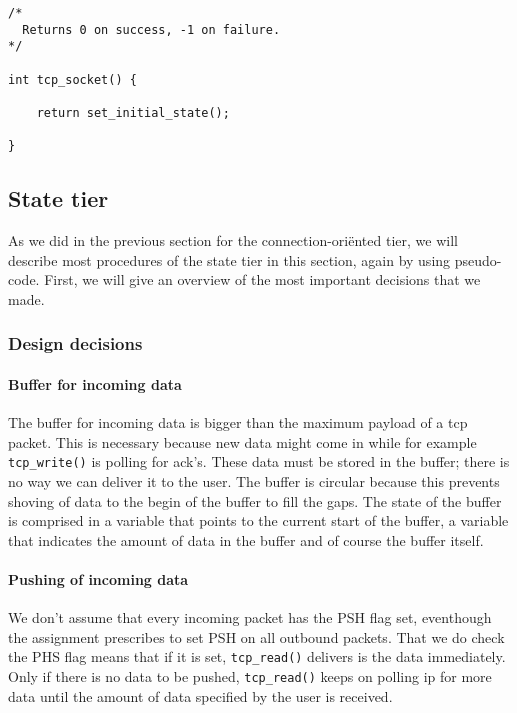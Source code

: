 \documentclass[11pt]{article}
\begin{document}
\begin{lstlisting}[title=Procedure tcp\_socket]
/*
  Returns 0 on success, -1 on failure.
*/

int tcp_socket() {

    return set_initial_state();

}
\end{lstlisting}



\subsection{State tier}

As we did in the previous section for the connection-ori\"ented tier, we
will describe most procedures of the state tier in this section, again by
using pseudo-code.
First, we will give an overview of the most important decisions that we made.


\subsubsection{Design decisions}


\paragraph{Buffer for incoming data}
    The buffer for incoming data is bigger than the maximum payload of a tcp
    packet. This is necessary because new data might come in while for example 
    \lstinline|tcp_write()| is polling for ack's. These data must be stored in the 
    buffer; 
    there is no way we can deliver it to the user.
    The buffer is circular because this prevents shoving of data to the begin of 
    the buffer to fill the gaps. 
    The state of the buffer is comprised in a variable that points to the 
    current start of the buffer, a variable that indicates the amount of data in 
    the buffer and of course the buffer itself.    

\paragraph{Pushing of incoming data}
    We don't assume that every incoming packet has the PSH flag set, eventhough 
    the assignment prescribes to set PSH on all outbound packets. That we do
    check the PHS flag means 
    that if it is set, \lstinline|tcp_read()| delivers is the data immediately.
    Only if there is no data to be pushed, \lstinline|tcp_read()| keeps on polling 
    ip for 
    more data until the amount of data specified by the user is received.
    
\end{document}
